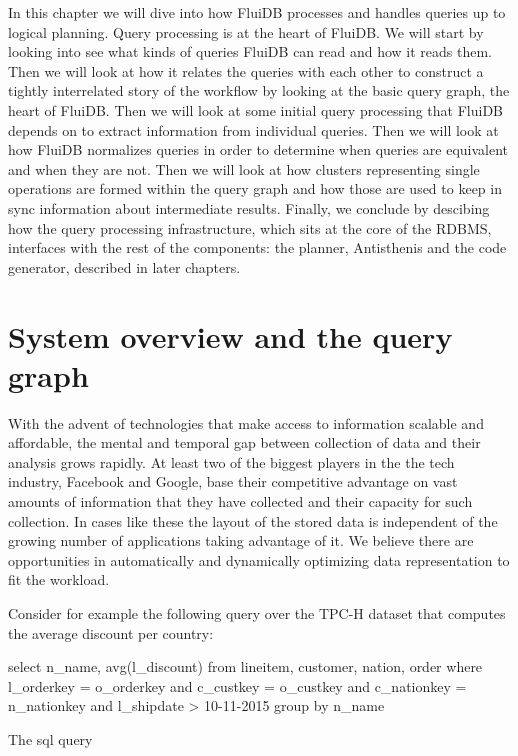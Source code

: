 In this chapter we will dive into how FluiDB processes and handles
queries up to logical planning. Query processing is at the heart of
FluiDB. We will start by looking into see what kinds of queries FluiDB
can read and how it reads them. Then we will look at how it relates
the queries with each other to construct a tightly interrelated story
of the workflow by looking at the basic query graph, the heart of
FluiDB. Then we will look at some initial query processing that FluiDB
depends on to extract information from individual queries. Then we
will look at how FluiDB normalizes queries in order to determine when
queries are equivalent and when they are not. Then we will look at how
clusters representing single operations are formed within the query
graph and how those are used to keep in sync information about
intermediate results. Finally, we conclude by descibing how the query
processing infrastructure, which sits at the core of the RDBMS,
interfaces with the rest of the components: the planner, Antisthenis
and the code generator, described in later chapters.

\section{System overview and the query graph}
\label{sec:optimizer_system_overview}
With the advent of technologies that make access to information
scalable and affordable, the mental and temporal gap between
collection of data and their analysis grows rapidly. At least two of
the biggest players in the the tech industry, Facebook and Google,
base their competitive advantage on vast amounts of information that
they have collected and their capacity for such collection. In cases
like these the layout of the stored data is independent of the growing
number of applications taking advantage of it. We believe there are
opportunities in automatically and dynamically optimizing data
representation to fit the workload.

Consider for example the following query over the TPC-H dataset that
computes the average discount per country:

\begin{code}
  \begin{sqlcode}
    select      n_name, avg(l_discount)
    from        lineitem, customer, nation, order
    where       l_orderkey = o_orderkey
    and         c_custkey = o_custkey
    and         c_nationkey = n_nationkey
    and         l_shipdate > 10-11-2015
    group by    n_name
  \end{sqlcode}
  \caption{The sql query}
\end{code}

